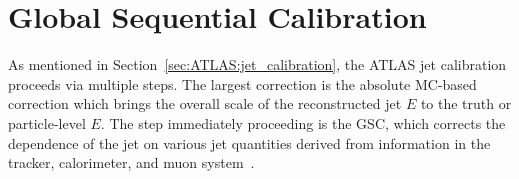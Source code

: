 \section{Global Sequential Calibration}
\label{sec:GenNI:jetreco}
As mentioned in Section~\ref{sec:ATLAS:jet_calibration}, the ATLAS jet calibration proceeds via multiple steps.
The largest correction is the absolute MC-based correction which brings the overall scale of the reconstructed jet $E$ to the truth or particle-level $E$.
The step immediately proceeding is the GSC, which corrects the dependence of the jet \pt{} on various jet quantities derived from information in the tracker, calorimeter, and muon system~\cite{PERF-2011-04,Aaboud:2019ibw,PERF-2016-04}.



